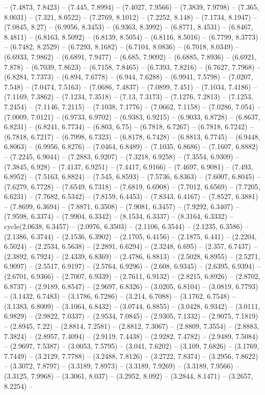 -- (7.4873, 7.8423) -- (7.445, 7.8994) -- (7.4027, 7.9566) -- (7.3839, 7.9798) -- (7.365, 8.0031) -- (7.321, 8.0522) -- (7.2769, 8.1012) -- (7.2252, 8.148) -- (7.1734, 8.1947) -- (7.0845, 8.27) -- (6.9956, 8.3453) -- (6.9363, 8.3992) -- (6.8771, 8.4531) -- (6.8467, 8.4811) -- (6.8163, 8.5092) -- (6.8139, 8.5054) -- (6.8116, 8.5016) -- (6.7799, 8.3773) -- (6.7482, 8.2529) -- (6.7293, 8.1682) -- (6.7104, 8.0836) -- (6.7018, 8.0349) -- (6.6933, 7.9862) -- (6.6891, 7.9477) -- (6.685, 7.9092) -- (6.6885, 7.8936) -- (6.6921, 7.878) -- (6.7039, 7.8623) -- (6.7158, 7.8465) -- (6.7393, 7.8216) -- (6.7627, 7.7968) -- (6.8284, 7.7373) -- (6.894, 7.6778) -- (6.944, 7.6288) -- (6.9941, 7.5798) -- (7.0207, 7.548) -- (7.0474, 7.5163) -- (7.0686, 7.4837) -- (7.0899, 7.451) -- (7.1034, 7.4186) -- (7.1169, 7.3862) -- (7.1234, 7.3518) -- (7.13, 7.3173) -- (7.1276, 7.2813) -- (7.1253, 7.2454) -- (7.1146, 7.2115) -- (7.1038, 7.1776) -- (7.0662, 7.1158) -- (7.0286, 7.054) -- (7.0009, 7.0121) -- (6.9733, 6.9702) -- (6.9383, 6.9215) -- (6.9033, 6.8728) -- (6.8637, 6.8231) -- (6.8241, 6.7734) -- (6.803, 6.75) -- (6.7818, 6.7267) -- (6.7818, 6.7242) -- (6.7818, 6.7217) -- (6.7998, 6.7323) -- (6.8178, 6.7428) -- (6.8813, 6.7745) -- (6.9448, 6.8063) -- (6.9956, 6.8276) -- (7.0464, 6.8489) -- (7.1035, 6.8686) -- (7.1607, 6.8882) -- (7.2245, 6.9044) -- (7.2883, 6.9207) -- (7.3218, 6.9258) -- (7.3554, 6.9309) -- (7.3845, 6.928) -- (7.4137, 6.9251) -- (7.4417, 6.9166) -- (7.4697, 6.9081) -- (7.493, 6.8952) -- (7.5163, 6.8824) -- (7.545, 6.8593) -- (7.5736, 6.8363) -- (7.6007, 6.8045) -- (7.6279, 6.7728) -- (7.6549, 6.7318) -- (7.6819, 6.6908) -- (7.7012, 6.6569) -- (7.7205, 6.6231) -- (7.7682, 6.5342) -- (7.8159, 6.4453) -- (7.8343, 6.4167) -- (7.8527, 6.3881) -- (7.8699, 6.3694) -- (7.8871, 6.3508) -- (7.9081, 6.3457) -- (7.9292, 6.3407) -- (7.9598, 6.3374) -- (7.9904, 6.3342) -- (8.1534, 6.3337) -- (8.3164, 6.3332) -- cycle(2.0638, 6.3457) -- (2.0976, 6.3503) -- (2.1106, 6.3544) -- (2.1235, 6.3586) -- (2.1386, 6.3744) -- (2.1536, 6.3902) -- (2.1705, 6.4156) -- (2.1875, 6.441) -- (2.2204, 6.5024) -- (2.2534, 6.5638) -- (2.2891, 6.6294) -- (2.3248, 6.695) -- (2.357, 6.7437) -- (2.3892, 6.7924) -- (2.4339, 6.8369) -- (2.4786, 6.8813) -- (2.5028, 6.8955) -- (2.5271, 6.9097) -- (2.5517, 6.9197) -- (2.5764, 6.9296) -- (2.608, 6.9345) -- (2.6395, 6.9394) -- (2.6701, 6.9366) -- (2.7007, 6.9339) -- (2.7611, 6.9132) -- (2.8215, 6.8926) -- (2.8702, 6.8737) -- (2.9189, 6.8547) -- (2.9697, 6.8326) -- (3.0205, 6.8104) -- (3.0819, 6.7793) -- (3.1432, 6.7483) -- (3.1786, 6.7286) -- (3.214, 6.7088) -- (3.1762, 6.7548) -- (3.1383, 6.8009) -- (3.1064, 6.8432) -- (3.0744, 6.8855) -- (3.0428, 6.9342) -- (3.0111, 6.9829) -- (2.9822, 7.0337) -- (2.9534, 7.0845) -- (2.9305, 7.1332) -- (2.9075, 7.1819) -- (2.8945, 7.22) -- (2.8814, 7.2581) -- (2.8812, 7.3067) -- (2.8809, 7.3554) -- (2.8883, 7.3824) -- (2.8957, 7.4094) -- (2.9119, 7.4438) -- (2.9282, 7.4782) -- (2.9489, 7.5084) -- (2.9697, 7.5387) -- (3.0053, 7.5795) -- (3.041, 7.6202) -- (3.109, 7.6826) -- (3.1769, 7.7449) -- (3.2129, 7.7788) -- (3.2488, 7.8126) -- (3.2722, 7.8374) -- (3.2956, 7.8622) -- (3.3072, 7.8797) -- (3.3189, 7.8973) -- (3.3189, 7.9269) -- (3.3189, 7.9566) -- (3.3125, 7.9968) -- (3.3061, 8.037) -- (3.2952, 8.092) -- (3.2844, 8.1471) -- (3.2657, 8.2254) -- 